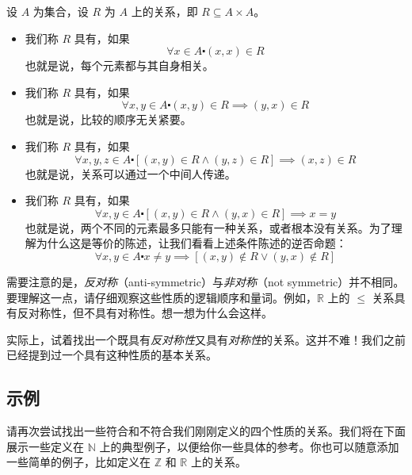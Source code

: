 \begin{definition}
    设 $A$ 为集合，设 $R$ 为 $A$ 上的关系，即 $R \subseteq A \times A$。
    \begin{itemize}
        \item 我们称 $R$ 具有，如果
            \[\forall x \in A \centerdot (x, x) \in R\]
            也就是说，每个元素都与其自身相关。
        \item 我们称 $R$ 具有，如果
            \[\forall x,y \in A \centerdot (x, y) \in R \implies (y,x) \in R\]
            也就是说，比较的顺序无关紧要。
        \item 我们称 $R$ 具有，如果
            \[\forall x, y, z \in A \centerdot [(x, y) \in R \land (y, z) \in R] \implies (x, z) \in R\]
            也就是说，关系可以通过一个中间人传递。
        \item 我们称 $R$ 具有，如果
            \[\forall x, y \in A \centerdot [(x, y) \in R \land (y, x) \in R] \implies x = y\]
            也就是说，两个不同的元素最多只能有一种关系，或者根本没有关系。为了理解为什么这是等价的陈述，让我们看看上述条件陈述的逆否命题：
            \[\forall x, y \in A \centerdot x \ne y \implies [(x, y) \notin R \lor (y, x) \notin R]\]
    \end{itemize}
\end{definition}

需要注意的是，\emph{反对称}（anti-symmetric）与\emph{非对称}（not symmetric）并不相同。要理解这一点，请仔细观察这些性质的逻辑顺序和量词。例如，$\mathbb{R}$ 上的 $\le$ 关系具有反对称性，但不具有对称性。想一想为什么会这样。

实际上，试着找出一个既具有\emph{反对称性}又具有\emph{对称性}的关系。这并不难！我们之前已经提到过一个具有这种性质的基本关系。

\subsection{示例}

请再次尝试找出一些符合和不符合我们刚刚定义的四个性质的关系。我们将在下面展示一些定义在 $\mathbb{N}$ 上的典型例子，以便给你一些具体的参考。你也可以随意添加一些简单的例子，比如定义在 $\mathbb{Z}$ 和 $\mathbb{R}$ 上的关系。

